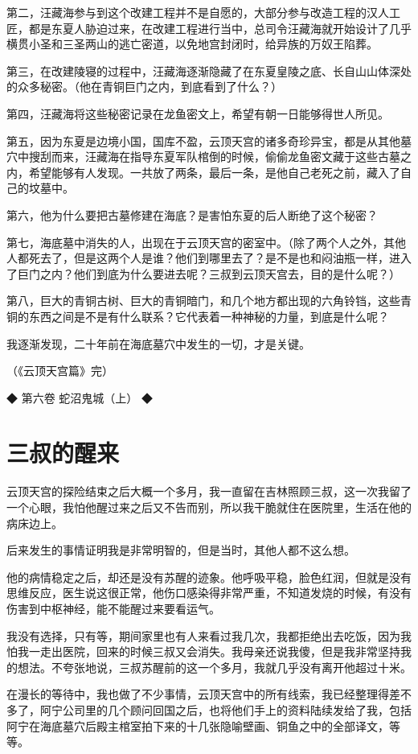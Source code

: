 第二，汪藏海参与到这个改建工程并不是自愿的，大部分参与改造工程的汉人工匠，都是东夏人胁迫过来，在改建工程进行当中，总司令汪藏海就开始设计了几乎横贯小圣和三圣两山的逃亡密道，以免地宫封闭时，给异族的万奴王陷葬。

第三，在改建陵寝的过程中，汪藏海逐渐隐藏了在东夏皇陵之底、长自山山体深处的众多秘密。（他在青铜巨门之内，到底看到了什么？）

第四，汪藏海将这些秘密记录在龙鱼密文上，希望有朝一日能够得世人所见。

第五，因为东夏是边境小国，国库不盈，云顶天宫的诸多奇珍异宝，都是从其他墓穴中搜刮而来，汪藏海在指导东夏军队棺倒的时候，偷偷龙鱼密文藏于这些古墓之内，希望能够有人发现。一共放了两条，最后一条，是他自己老死之前，藏入了自己的坟墓中。

第六，他为什么要把古墓修建在海底？是害怕东夏的后人断绝了这个秘密？

第七，海底墓中消失的人，出现在于云顶天宫的密室中。（除了两个人之外，其他人都死去了，但是这两个人是谁？他们到哪里去了？是不是也和闷油瓶一样，进入了巨门之内？他们到底为什么要进去呢？三叔到云顶天宫去，目的是什么呢？）

第八，巨大的青铜古树、巨大的青铜暗门，和几个地方都出现的六角铃铛，这些青铜的东西之间是不是有什么联系？它代表着一种神秘的力量，到底是什么呢？

我逐渐发现，二十年前在海底墓穴中发生的一切，才是关键。

（《云顶天宫篇》完）

◆ 第六卷 蛇沼鬼城（上） ◆

\chapter{三叔的醒来}

云顶天宫的探险结束之后大概一个多月，我一直留在吉林照顾三叔，这一次我留了一个心眼，我怕他醒过来之后又不告而别，所以我干脆就住在医院里，生活在他的病床边上。

后来发生的事情证明我是非常明智的，但是当时，其他人都不这么想。

他的病情稳定之后，却还是没有苏醒的迹象。他呼吸平稳，脸色红润，但就是没有思维反应，医生说这很正常，他伤口感染得非常严重，不知道发烧的时候，有没有伤害到中枢神经，能不能醒过来要看运气。

我没有选择，只有等，期间家里也有人来看过我几次，我都拒绝出去吃饭，因为我怕我一走出医院，回来的时候三叔又会消失。我母亲还说我傻，但是我非常坚持我的想法。不夸张地说，三叔苏醒前的这一个多月，我就几乎没有离开他超过十米。

在漫长的等待中，我也做了不少事情，云顶天宫中的所有线索，我已经整理得差不多了，阿宁公司里的几个顾问回国之后，也将他们手上的资料陆续发给了我，包括阿宁在海底墓穴后殿主棺室拍下来的十几张隐喻壁画、铜鱼之中的全部译文，等等。

